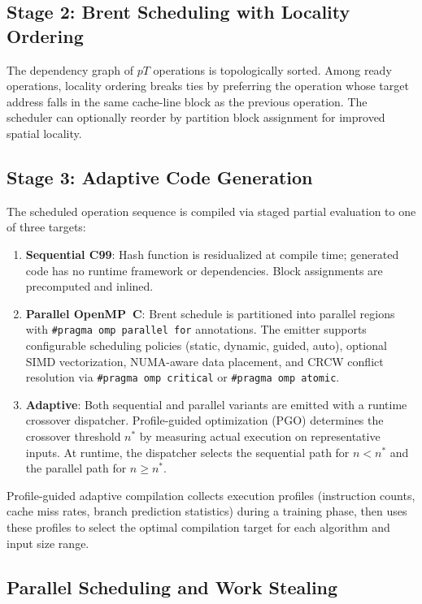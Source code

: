 \documentclass[11pt]{article}
\begin{document}
\subsection{Stage 2: Brent Scheduling with Locality Ordering}

The dependency graph of $pT$ operations is topologically sorted.
Among ready operations, locality ordering breaks ties by preferring
the operation whose target address falls in the same cache-line block
as the previous operation.  The scheduler can optionally reorder by
partition block assignment for improved spatial locality.

\subsection{Stage 3: Adaptive Code Generation}

The scheduled operation sequence is compiled via staged partial
evaluation to one of three targets:
\begin{enumerate}
\item \textbf{Sequential C99}: Hash function is residualized at compile
  time; generated code has no runtime framework or dependencies.
  Block assignments are precomputed and inlined.
\item \textbf{Parallel OpenMP~C}: Brent schedule is partitioned into
  parallel regions with \texttt{\#pragma omp parallel for} annotations.
  The emitter supports configurable scheduling policies (static, dynamic,
  guided, auto), optional SIMD vectorization, NUMA-aware data placement,
  and CRCW conflict resolution via \texttt{\#pragma omp critical} or
  \texttt{\#pragma omp atomic}.
\item \textbf{Adaptive}: Both sequential and parallel variants are emitted
  with a runtime crossover dispatcher.  Profile-guided optimization (PGO)
  determines the crossover threshold $n^*$ by measuring actual execution
  on representative inputs.  At runtime, the dispatcher selects the
  sequential path for $n < n^*$ and the parallel path for $n \ge n^*$.
\end{enumerate}

Profile-guided adaptive compilation collects execution profiles
(instruction counts, cache miss rates, branch prediction statistics)
during a training phase, then uses these profiles to select the optimal
compilation target for each algorithm and input size range.

\subsection{Parallel Scheduling and Work Stealing}
\end{document}
